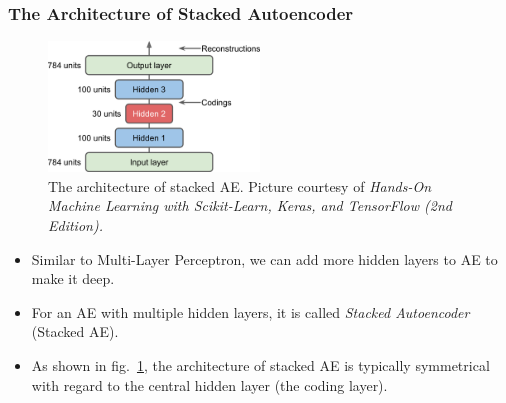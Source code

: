 \documentclass{beamer}
\begin{document}
\begin{frame}
\setlength{\leftmargini}{0.3cm}
\setlength{\leftmarginii}{0.6cm}
\setlength{\leftmarginiii}{0.9cm}
\frametitle{The Architecture of Stacked Autoencoder}
\begin{figure}[h!]
\centering
\includegraphics[width=0.5\textwidth]{./figure/sae}
\caption{The architecture of stacked AE. Picture courtesy of \emph{Hands-On Machine Learning with Scikit-Learn, Keras, and TensorFlow (2nd Edition).}}\label{fig:sae}
\end{figure}
\vspace{-0.5cm}
\begin{itemize}
\footnotesize
\item Similar to Multi-Layer Perceptron, we can add more hidden layers to AE to make it deep.
\item For an AE with multiple hidden layers, it is called \emph{Stacked Autoencoder} (Stacked AE).
\item As shown in fig.~\ref{fig:sae}, the architecture of stacked AE is typically symmetrical with regard to the central hidden layer (the coding layer). 
\end{itemize}
\end{frame}
\end{document}
